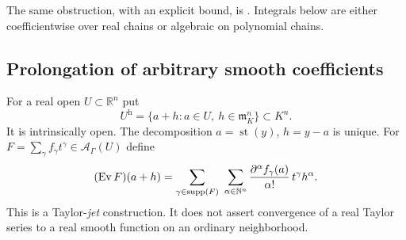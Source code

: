 \documentclass[11pt,letterpaper]{article}
\theoremstyle{definition}
\theoremstyle{remark}
\newcommand{\R}{\mathbb R}\newcommand{\C}{\mathbb C}
\newcommand{\A}{\mathscr A}\newcommand{\OO}{\mathcal O}\newcommand{\mm}{\mathfrak m}
\newcommand{\supp}{\operatorname{supp}}\newcommand{\st}{\operatorname{st}}
\newcommand{\ev}{\operatorname{Ev}}\newcommand{\jet}{\operatorname{J}}
\newcommand{\halo}[1]{#1^{\mathrm h}}
\begin{document}
The same obstruction, with an explicit bound, is .
Integrals below are either coefficientwise over real chains or algebraic on
polynomial chains.

\subsection{Prolongation of arbitrary smooth coefficients}

For a real open $U\subset\R^n$ put
\[
 \halo U=\{a+h:a\in U,\ h\in\mm_K^n\}\subset K^n.
\]
It is intrinsically open. The decomposition $a=\st(y)$, $h=y-a$ is unique.
For $F=\sum_\gamma f_\gamma t^\gamma\in\A_\Gamma(U)$ define
\begin{equation}\label{vtf:eq:eval}
 (\ev F)(a+h)=
 \sum_{\gamma\in\supp(F)}\ \sum_{\alpha\in\N^n}
 \frac{\partial^\alpha f_\gamma(a)}{\alpha!}\,t^\gamma h^\alpha.
\end{equation}
This is a Taylor-\emph{jet} construction. It does not assert convergence of a
real Taylor series to a real smooth function on an ordinary neighborhood.
\end{document}

